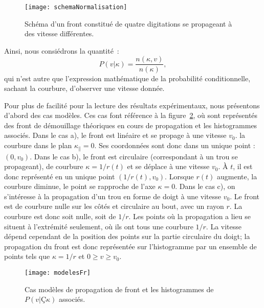 {{\begin{figure}[!htb]
\centering
\texttt{[image: schemaNormalisation]}
\caption{Schéma d'un front constitué de quatre digitations se propageant à des vitesse différentes.}
\label{schemaNormalisation}
\end{figure}
Ainsi, nous consiédrons la quantité~:
\begin{equation}
P(v|\kappa) = \dfrac{n(\kappa,v)}{n(\kappa)},
\end{equation}
qui n'est autre que l'expression mathématique de la probabilité conditionnelle, sachant la courbure, d'observer une vitesse donnée.\par \vspace{12pt}
Pour plus de facilité pour la lecture des résultats expérimentaux, nous  présentons d'abord des cas modèles. Ces cas font référence à la figure~\ref{modelesFr}, où sont représentés des front de démouillage théoriques en cours de propagation et les histogrammes associés. Dans le cas a), le front est linéaire et se propage à une vitesse $v_0$. la courbure dans le plan $\kappa_\parallel = 0$. Ses coordonnées sont donc dans un unique point : $(0, v_0)$. Dans le cas b), le front est circulaire (correspondant à un trou se propageant), de courbure $\kappa =1/r(t)$ et se déplace à une vitesse $v_0$. À $t$, il est donc représenté en un unique point $(1/r(t), v_0)$. Lorsque $r(t)$ augmente, la courbure diminue, le point se rapproche de l’axe $\kappa = 0$. Dans le cas c), on s’intéresse à la propagation d’un trou en forme de doigt à une vitesse $v_0$. Le front est de courbure nulle sur les côtés et circulaire au bout, avec un rayon $r$. La courbure est donc soit nulle, soit de $1/r$. Les points où la propagation a lieu se situent à l’extrémité seulement, où ils ont tous une courbure $1/r$. La vitesse dépend cependant de la position des points sur la partie circulaire du doigt; la propagation du front est donc représentée sur l'histogramme par un ensemble de points tels que $\kappa = 1/r$ et $0 \geq v \geq v_0$.\par 

\begin{figure}[!htb]
\centering
\texttt{[image: modelesFr]}
\caption{Cas modèles de propagation de front et les histogrammes de $P(v|Ç\kappa)$ associés.}
\label{modelesFr}
\end{figure}

}}
